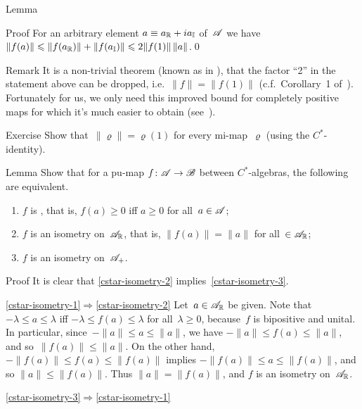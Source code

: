 \documentclass[a]{subfiles}
\begin{document}
\begin{parsec}
\begin{point}{Lemma}
\begin{point}{Proof}
For an arbitrary element $a\equiv a_{\mathbb{R}}+ia_{\mathbb{I}}$
of~$\mathscr{A}$
we have 
$\|f(a)\|\leqslant \|f(a_{\mathbb{R}})\|+\|f(a_{\mathbb{I}})\|\leqslant 2\|f(1)\|\,\|a\|$.\qed
\end{point}
\begin{point}{Remark}%
It is a non-trivial theorem (known as %
in \cite{paulsen}),
that the factor ``2'' in the statement above
can be dropped, i.e.~$\|f\|=\|f(1)\|$
(c.f.~Corollary~1 of~\cite{russodye}).
Fortunately for us,
we only need
this improved bound
for completely positive maps
for which it's much easier to obtain (see~).
\end{point}
\end{point}
\begin{point}{Exercise}%
Show that~$\|\varrho\|=\varrho(1)$
for every mi-map~$\varrho$
(using the $C^*$-identity).
\end{point}
\begin{point}{Lemma}%
Show that for a pu-map $f\colon \mathscr{A}\to\mathscr{B}$
between $C^*$-algebras,
the following are equivalent.
\begin{enumerate}
\item\label{cstar-isometry-1}
$f$ is %
%
, that is, $f(a)\geq 0$ iff $a\geq 0$
for all~$a\in\mathscr{A}$;
\item\label{cstar-isometry-2}%
$f$ is an isometry on~$\mathscr{A}_{\mathbb{R}}$, 
that is, $\|f(a)\|=\|a\|$ for all~$\in \mathscr{A}_{\mathbb{R}}$;
\item\label{cstar-isometry-3}
	$f$ is an isometry on~$\mathscr{A}_{+}$.
\end{enumerate}
\begin{point}{Proof}%
It is clear that \ref{cstar-isometry-2} implies~\ref{cstar-isometry-3}.
\begin{point}{\ref{cstar-isometry-1}$\Longrightarrow$\ref{cstar-isometry-2}}%
Let~$a\in \mathscr{A}_{\mathbb{R}}$ be given.
Note that $-\lambda \leq a\leq \lambda$
iff $-\lambda \leq f(a) \leq \lambda$
for all~$\lambda \geq 0$,
because~$f$ is bipositive and unital.
In particular,
since~$-\|a\|\leq a\leq \|a\|$,
we have $-\|a\|\leq f(a)\leq \|a\|$,
and so~$\|f(a)\|\leq \|a\|$.
On the other hand,
$-\|f(a)\|\leq f(a)\leq \|f(a)\|$
implies $-\|f(a)\|\leq a\leq \|f(a)\|$,
and so $\|a\|\leq \|f(a)\|$.
Thus $\|a\|=\|f(a)\|$,
and $f$ is an isometry on~$\mathscr{A}_{\mathbb{R}}$.
\end{point}
\begin{point}{\ref{cstar-isometry-3}$\Longrightarrow$\ref{cstar-isometry-1}}%

\end{point}
\end{point}
\end{point}
\end{parsec}
\end{document}
